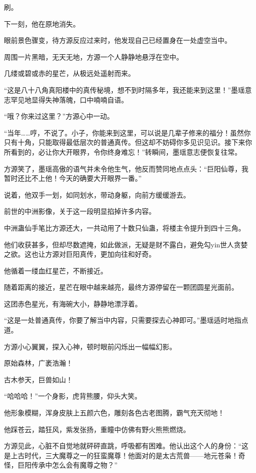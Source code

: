 \begin{this_body}
刷。

下一刻，他在原地消失。

眼前景色骤变，待方源反应过来时，他发现自己已经置身在一处虚空当中。

周围一片黑暗，无天无地，方源一个人静静地悬浮在空中。

几缕或碧或赤的星芒，从极远处遥射而来。

“这是八十八角真阳楼中的真传秘境，想不到时隔多年，我还能来到这里！”墨瑶意志罕见地显得失神落魄，口中喃喃自语。

“哦？你来过这里？”方源心中一动。

“当年……哼，不说了。小子，你能来到这里，可以说是几辈子修来的福分！虽然你只有十角，只能取得最低层次的普通真传。但这却不妨碍你多见识见识。接下来你所看到的，必让你大开眼界，令你终身难忘！”转瞬间，墨瑶意志便恢复往常。

方源笑了，墨瑶高傲的语气并未令他生气，他反而赞同地点点头：“巨阳仙尊，我暂时还比不上他！今天的确要大开眼界一番。”

说着，他双手一划，如同划水，带动身躯，向前方缓缓游去。

前世的中洲影像，关于这一段明显掐掉许多内容。

中洲蛊仙手笔比方源还大，一共动用了十数只仙蛊，将楼主令提升到四十三角。

他们收获甚多，但却尽数遮掩，如此做派，无疑是财不露白，避免勾yin世人贪婪之欲。这也让方源对巨阳真传，更加向往和好奇。

他循着一缕血红星芒，不断接近。

随着距离的接近，星芒在眼中越来越亮，最终方源停留在一颗团圆星光面前。

这团赤色星光，有海碗大小，静静地漂浮着。

“这是一处普通真传，你要了解当中内容，只需要探去心神即可。”墨瑶适时地指点道。

方源小心翼翼，探入心神，顿时眼前闪烁出一幅幅幻影。

原始森林，广袤浩瀚！

古木参天，巨兽如山！

“哈哈哈！”一个身影，虎背熊腰，仰头大笑。

他形象模糊，浑身皮肤上五颜六色，雕刻各色古老图腾，霸气充天彻地！

他踩苍云，踏狂风，紫发张扬，重瞳中仿佛有野火熊熊燃烧。

方源见此，心脏不自觉地就砰砰直跳，呼吸都有困难。他认出这个人的身份：“这是上古时代，三大魔尊之一的狂蛮魔尊！他面对的是太古荒兽——地元苍枭！奇怪，巨阳传承中怎么会有魔尊之物？”


\end{this_body}

